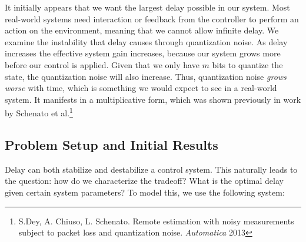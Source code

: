 \documentclass[10pt]{article}
\begin{document}

It initially appears that we want the largest delay possible in our system. Most real-world systems need interaction or feedback from the controller to perform an action on the environment, meaning that we cannot allow infinite delay. We examine the instability that delay causes through quantization noise. As delay increases the effective system gain increases, because our system grows more before our control is applied. Given that we only have $m$ bits to quantize the state, the quantization noise will also increase. Thus, quantization noise \textit{grows worse} with time, which is something we would expect to see in a real-world system. It manifests in a multiplicative form, which was shown previously in work by Schenato et al.\footnote{S.Dey, A. Chiuso, L. Schenato. Remote estimation with noisy measurements subject to packet loss and quantization noise. \textit{Automatica} 2013} 


\subsection*{Problem Setup and Initial Results}
Delay can both stabilize and destabilize a control system. This naturally leads to the question: how do we characterize the tradeoff? What is the optimal delay given certain system parameters? To model this, we use the following system:
\end{document}
